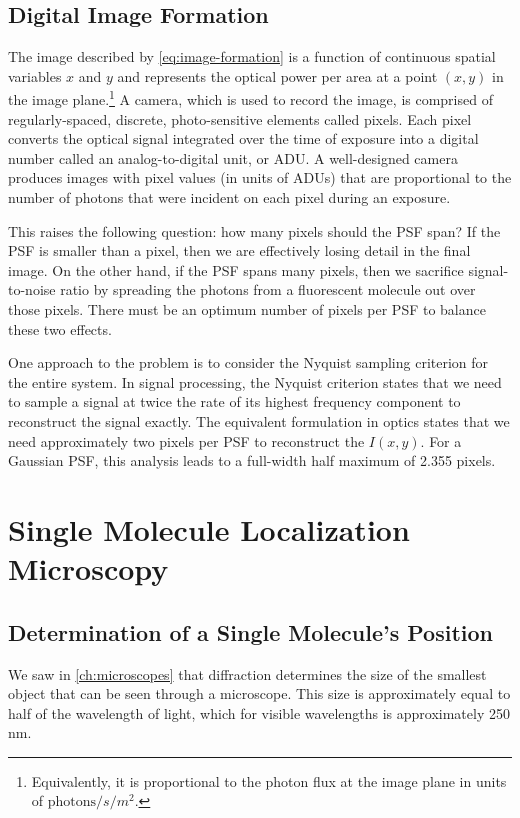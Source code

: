 \documentclass[10pt,a4paper,oneside]{book}
\begin{document}
\section{Digital Image Formation}

The image described by \autoref{eq:image-formation} is a function of continuous spatial variables $x$ and $y$ and represents the optical power per area at a point $\left(x, y\right)$ in the image plane.\footnote{Equivalently, it is proportional to the photon flux at the image plane in units of $\text{photons} / s / m^2$.} A camera, which is used to record the image, is comprised of regularly-spaced, discrete, photo-sensitive elements called pixels. Each pixel converts the optical signal integrated over the time of exposure into a digital number called an analog-to-digital unit, or ADU. A well-designed camera produces images with pixel values (in units of ADUs) that are proportional to the number of photons that were incident on each pixel during an exposure.

This raises the following question: how many pixels should the PSF span? If the PSF is smaller than a pixel, then we are effectively losing detail in the final image. On the other hand, if the PSF spans many pixels, then we sacrifice signal-to-noise ratio by spreading the photons from a fluorescent molecule out over those pixels. There must be an optimum number of pixels per PSF to balance these two effects.

One approach to the problem is to consider the Nyquist sampling criterion for the entire system. In signal processing, the Nyquist criterion states that we need to sample a signal at twice the rate of its highest frequency component to reconstruct the signal exactly. The equivalent formulation in optics states that we need approximately two pixels per PSF to reconstruct the $I \left(x, y\right)$. For a Gaussian PSF, this analysis leads to a full-width half maximum of 2.355 pixels.

\chapter{Single Molecule Localization Microscopy}

\section{Determination of a Single Molecule's Position}

We saw in \autoref{ch:microscopes} that diffraction determines the size of the smallest object that can be seen through a microscope. This size is approximately equal to half of the wavelength of light, which for visible wavelengths is approximately 250 nm.
\end{document}
